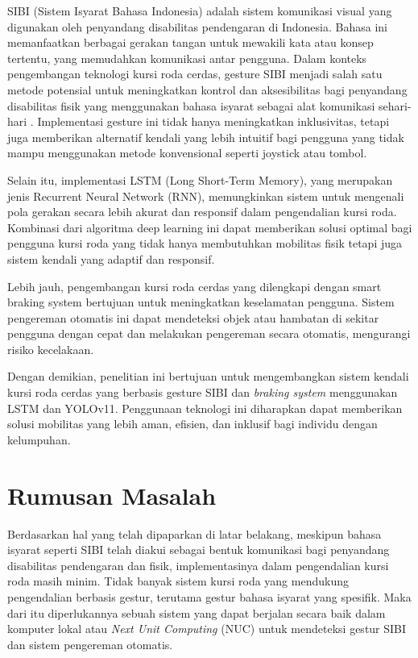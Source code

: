 SIBI (Sistem Isyarat Bahasa Indonesia) adalah sistem komunikasi visual yang digunakan oleh penyandang disabilitas pendengaran di Indonesia. Bahasa ini memanfaatkan berbagai gerakan tangan untuk mewakili kata atau konsep tertentu, yang memudahkan komunikasi antar pengguna\cite{Rani2019}. Dalam konteks pengembangan teknologi kursi roda cerdas, gesture SIBI menjadi salah satu metode potensial untuk meningkatkan kontrol dan aksesibilitas bagi penyandang disabilitas fisik yang menggunakan bahasa isyarat sebagai alat komunikasi sehari-hari . Implementasi gesture ini tidak hanya meningkatkan inklusivitas, tetapi juga memberikan alternatif kendali yang lebih intuitif bagi pengguna yang tidak mampu menggunakan metode konvensional seperti joystick atau tombol.

Selain itu, implementasi LSTM (Long Short-Term Memory), yang merupakan jenis Recurrent Neural Network (RNN), memungkinkan sistem untuk mengenali pola gerakan secara lebih akurat dan responsif dalam pengendalian kursi roda\cite{Graves2019}. Kombinasi dari algoritma deep learning ini dapat memberikan solusi optimal bagi pengguna kursi roda yang tidak hanya membutuhkan mobilitas fisik tetapi juga sistem kendali yang adaptif dan responsif.

Lebih jauh, pengembangan kursi roda cerdas yang dilengkapi dengan smart braking system bertujuan untuk meningkatkan keselamatan pengguna. Sistem pengereman otomatis ini dapat mendeteksi objek atau hambatan di sekitar pengguna dengan cepat dan melakukan pengereman secara otomatis, mengurangi risiko kecelakaan.

Dengan demikian, penelitian ini bertujuan untuk mengembangkan sistem kendali kursi roda cerdas yang berbasis gesture SIBI dan \emph{braking system} menggunakan LSTM dan YOLOv11. Penggunaan teknologi ini diharapkan dapat memberikan solusi mobilitas yang lebih aman, efisien, dan inklusif bagi individu dengan kelumpuhan.
\section{Rumusan Masalah}
Berdasarkan hal yang telah dipaparkan di latar belakang, meskipun bahasa isyarat seperti SIBI telah diakui sebagai bentuk komunikasi bagi penyandang disabilitas pendengaran dan fisik, implementasinya dalam pengendalian kursi roda masih minim. Tidak banyak sistem kursi roda yang mendukung pengendalian berbasis gestur, terutama gestur bahasa isyarat yang spesifik. Maka dari itu diperlukannya sebuah sistem yang dapat berjalan secara baik dalam komputer lokal atau \emph{Next Unit Computing} (NUC) untuk mendeteksi gestur SIBI dan sistem pengereman otomatis.
